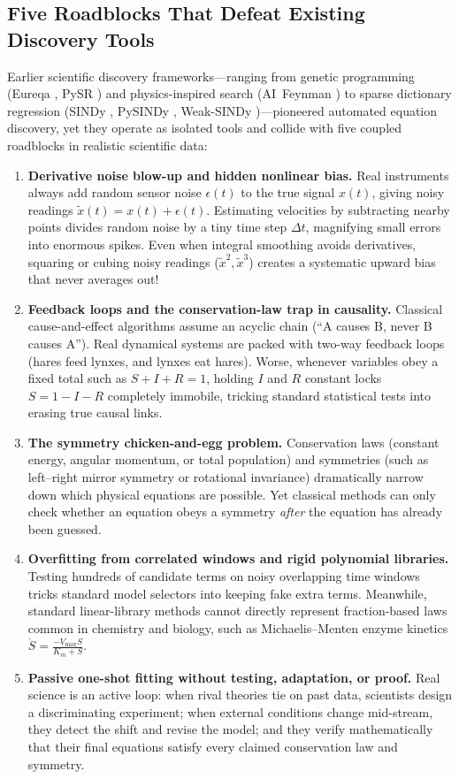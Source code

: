 \documentclass[11pt,a4paper]{article}
\begin{document}
\subsection{Five Roadblocks That Defeat Existing Discovery Tools}
Earlier scientific discovery frameworks—ranging from genetic programming (Eureqa \cite{schmidt2009distilling}, PySR \cite{cranmer2023pysr}) and physics-inspired search (AI~Feynman \cite{udrescu2020ai}) to sparse dictionary regression (SINDy \cite{brunton2016discovering}, PySINDy \cite{desilva2020pysindy}, Weak-SINDy \cite{messenger2021weak})—pioneered automated equation discovery, yet they operate as isolated tools and collide with five coupled roadblocks in realistic scientific data:

\begin{enumerate}
  \item \textbf{Derivative noise blow-up and hidden nonlinear bias.} Real instruments always add random sensor noise $\epsilon(t)$ to the true signal $x(t)$, giving noisy readings $\tilde{x}(t) = x(t) + \epsilon(t)$. Estimating velocities by subtracting nearby points divides random noise by a tiny time step $\Delta t$, magnifying small errors into enormous spikes. Even when integral smoothing avoids derivatives, squaring or cubing noisy readings ($\tilde{x}^2, \tilde{x}^3$) creates a systematic upward bias that never averages out!
  \item \textbf{Feedback loops and the conservation-law trap in causality.} Classical cause-and-effect algorithms assume an acyclic chain (``A causes B, never B causes A''). Real dynamical systems are packed with two-way feedback loops (hares feed lynxes, and lynxes eat hares). Worse, whenever variables obey a fixed total such as $S + I + R = 1$, holding $I$ and $R$ constant locks $S = 1 - I - R$ completely immobile, tricking standard statistical tests into erasing true causal links.
  \item \textbf{The symmetry chicken-and-egg problem.} Conservation laws (constant energy, angular momentum, or total population) and symmetries (such as left--right mirror symmetry or rotational invariance) dramatically narrow down which physical equations are possible. Yet classical methods can only check whether an equation obeys a symmetry \emph{after} the equation has already been guessed.
  \item \textbf{Overfitting from correlated windows and rigid polynomial libraries.} Testing hundreds of candidate terms on noisy overlapping time windows tricks standard model selectors into keeping fake extra terms. Meanwhile, standard linear-library methods cannot directly represent fraction-based laws common in chemistry and biology, such as Michaelis--Menten enzyme kinetics $\dot{S} = \frac{-V_{\max}S}{K_m + S}$.
  \item \textbf{Passive one-shot fitting without testing, adaptation, or proof.} Real science is an active loop: when rival theories tie on past data, scientists design a discriminating experiment; when external conditions change mid-stream, they detect the shift and revise the model; and they verify mathematically that their final equations satisfy every claimed conservation law and symmetry.
\end{enumerate}
\end{document}
